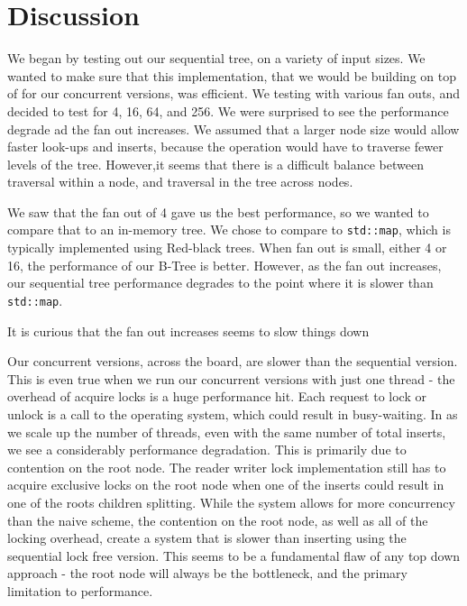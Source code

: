 \documentclass{sig-alternate}
\begin{document}
\section{Discussion}
We began by testing out our sequential tree, on a variety of input sizes.  We wanted to make sure that this implementation, that we would be building on top of for our concurrent versions, was efficient.  We testing with various fan outs, and decided to test for 4, 16, 64, and 256.  We were surprised to see the performance degrade ad the fan out increases.  We assumed that a larger node size would allow faster look-ups and inserts, because the operation would have to traverse fewer levels of the tree.  However,it seems that there is a difficult balance between traversal within a node, and traversal in the tree across nodes.

We saw that the fan out of 4 gave us the best performance, so we wanted to compare that to an in-memory tree.  We chose to compare to \texttt{std::map}, which is typically implemented using Red-black trees.  When fan out is small, either 4 or 16, the performance of our B-Tree is better.  However, as the fan out increases, our sequential tree performance degrades to the point where it is slower than \texttt{std::map}.

It is curious that the fan out increases seems to slow things down

Our concurrent versions, across the board, are slower than the sequential version.  This is even true when we run our concurrent versions with just one thread - the overhead of acquire locks is a huge performance hit.  Each request to lock or unlock is a call to the operating system, which could result in busy-waiting.  In as we scale up the number of threads, even with the same number of total inserts, we see a considerably performance degradation.  This is primarily due to contention on the root node.    The reader writer lock implementation still has to acquire exclusive locks on the root node when one of the inserts could result in one of the roots children splitting.  While the system allows for more concurrency than the naive scheme, the contention on the root node, as well as all of the locking overhead, create a system that is slower than inserting using the sequential lock free version.  This seems to be a fundamental flaw of any top down approach - the root node will always be the bottleneck, and the primary limitation to performance.
\end{document}
